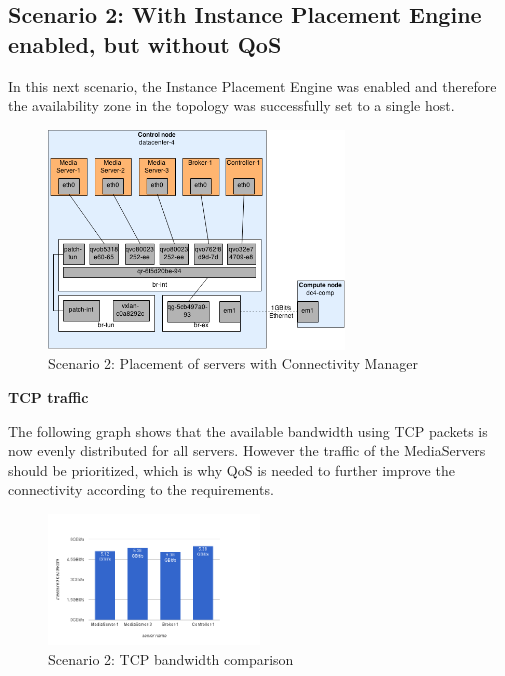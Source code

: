 \subsection{Scenario 2: With Instance Placement Engine enabled, but without QoS}

In this next scenario, the Instance Placement Engine was enabled and therefore the availability zone in the topology was successfully set to a single host.

\begin{figure}[H]
\centering

\includegraphics[width=0.7\textwidth]{images/evaluation/testbed_scenario2}

\caption{Scenario 2: Placement of servers with Connectivity Manager}
\end{figure}
\newpage
\textbf{TCP traffic}

The following graph shows that the available bandwidth using TCP packets is now evenly distributed for all servers. However the traffic of the MediaServers should be prioritized, which is why QoS is needed to further improve the connectivity according to the requirements.

\begin{figure}[H]
\centering

\includegraphics[width=0.5\textwidth]{images/evaluation/testbed_scenario2_bw}

\caption{Scenario 2: TCP bandwidth comparison}
\end{figure}

